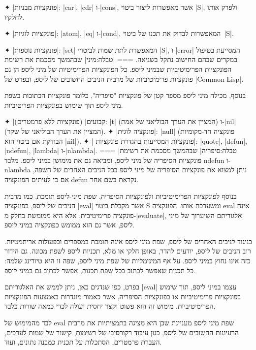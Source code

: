 ✦ \ע|פונקציות מבניות|: \E|car|, \E|cdr| ו-\E|cons|, אשר מאפשרות ליצור ביטוי
\E|S|, ולפרק אותו לחלקיו.

✦ \ע|פונקציות לוגיות|: \E|atom|, \E|eq| ו-\E|cond|, המאפשרות לבדוק את תכנו של
ביטוי~\E|S|.

✦ \ע|פונקציות נוספות|: \E|set| המאפשרת לתת שמות לביטויי \E|S|, ו-\E|error|
המסייעת בטיפול במקרים שבהם החישוב נתקל בשגיאה.
===
|טבלה:מיני| שבהמשך מסכמת את רשימת הפונקציות הפרימיטיביות שבמיני ליספ. כל
הפונקציות הפרימיטיות של מיני ליספ הן גם פונקציות פרימיטיביות של מרבית הניבים
החשובים של ליספ, ובפרט של \E|Common Lisp|.

בנוסף, מכילה מיני ליספ מספר קטן של פונקציות "סיפריה", כלומר פונקציות הכתובות
בשפת מיני ליספ תוך שימוש בפונקציות הפריטיביות.

✦ \ע|קבועים| (פונקציות ללא פרמטרים): \E|t| (המציין את הערך הבוליאני של אמת) ו-\E|nil|
(המציין את הערך הבוליאני של שקר).
✦ \ע|פונקציה לוגית|: \E|null| (פונקציה חד-מקומיות הבודקת אם ביטוי הוא \E|nil|).
✦ \ע| פונקציות המסייעות בהגדרת פונקציות|:
\E|quote|, \E|defun|, \E|ndefun|, \E|lambda| ו-\E|nlambda|.
===
|טבלה:סיפריה| שבהמשך מסכמת את רשימת פונקציות הסיפריה של מיני ליספ, ומביאה
גם את מימושן במיני ליספ. מלבד ndefun ו-nlambda ניתן למצוא את פונקציות הסיפריה
של מיני ליספ בכל הניבים האחרים של השפה, אם כי לעיתים הפונקציה defun נקראת בשם
אחר.

בנוסף לפונקציות הפרימיטיביות ולפונקציות הסיפריה, שפת מיני-ליספ תומכת, כמו מרבית
הניבים של ליספ, בפונקציה \E|eval| אשר מקבלת ביטוי S ומשערכת אותו. הפונקציה
eval אינה פונקציה פרימיטיבית, אלא היא ממומשת כחלק מ-\E|evaluate|, אלגוריתם
השיערוך של מיני ליספ, אשר גם הוא ממומש כפונקציה במיני ליספ.

בניגוד לניבים האחרים של ליספ, שפת מיני ליספ אינה תומכת במספרים ובפעולות
אריתמטיות. רוב הניבים של ליספ, יודעים להדר, באופן חלקי או מלא, תכניות ליספ לשפת
מכונה. גם הידור כזה אינו נחוץ במיני ליספ. על אף המינימליות של שפת מיני ליספ,
שפה זו היא טיורינג שלמה: כל תכנית שאפשר לכתוב בכל שפת תכנות, אפשר לכתוב גם
במיני ליספ.

בפרט, כפי שנדגים כאן, ניתן לממש את האלגוריתם \E|eval| עצמו במיני ליספ, תוך
שימוש בפונקציות פרימיטיביות או בפונקציות הסיפריה, אשר כאמור מוגדרות באמצעות
הפונקציות הפרימיטיביות. מימוש זה הוא פשוט וקצר יחסית ועולה לכדי כמאה שורות
בלבד.

לבד מהמימוש של eval שפת מיני ליספ מעניינת שכן היא מציגה בתמציתיות את מרבית
הרעיונות החשובים של ליספ, כגון עיבוד רקורסיבי של רשימות, קישור של שמות לערכים,
העברת פרמטרים, הסתכלות על תכנית כמבנה נתונים, ועוד.

